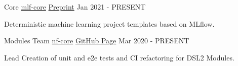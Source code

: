 

\begin{cventries}


	\cventry
	{Core} %
	{\href{https://www.mlf-core.com/index}{mlf-core}} %
	{\href{https://arxiv.org/abs/2104.07651}{Preprint}}
	{Jan 2021 - PRESENT} %
	{
		\begin{cvitems} %
			\item {Deterministic machine learning project templates based on MLflow.}
		\end{cvitems}
	}

	\cventry
	{Modules Team} %
	{\href{https://nf-co.re/}{nf-core}} %
	{\href{https://github.com/nf-core}{GitHub Page}} %
	{Mar 2020 - PRESENT} %
	{
		\begin{cvitems} %
			\item {Lead Creation of unit and e2e tests and CI refactoring for DSL2 Modules.}
		\end{cvitems}
	}




\end{cventries}
